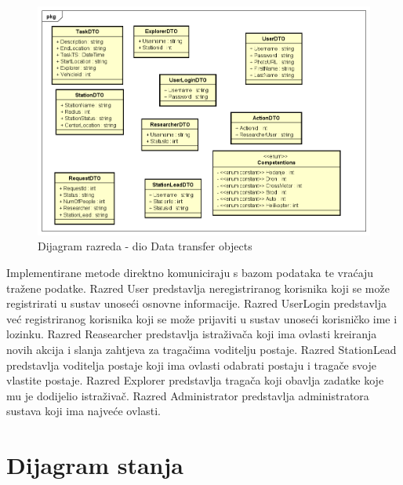 			
			\begin{figure}[H]
				\includegraphics[width=\textwidth]{slike/Class_Diagram0.PNG} %
				\caption{Dijagram razreda - dio Data transfer objects}
				\label{fig:dijagram_baze} %
			\end{figure}
			
			\vspace{36pt}
			
			Implementirane metode direktno komuniciraju s bazom podataka te vraćaju tražene podatke. Razred User predstavlja neregistriranog korisnika koji se može registrirati u sustav unoseći osnovne informacije. Razred UserLogin predstavlja već registriranog korisnika koji se može prijaviti u sustav unoseći korisničko ime i lozinku. Razred Reasearcher predstavlja istraživača koji ima ovlasti kreiranja novih akcija i slanja zahtjeva za tragačima voditelju postaje. Razred StationLead predstavlja voditelja postaje koji ima ovlasti odabrati postaju i tragače svoje vlastite postaje. Razred Explorer predstavlja tragača koji obavlja zadatke koje mu je dodijelio istraživač. Razred Administrator predstavlja administratora sustava koji ima najveće ovlasti.
			
			\vspace{36pt}
		
		\section{Dijagram stanja}
			
